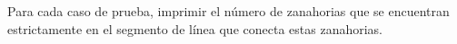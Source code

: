 Para cada caso de prueba, imprimir el número de zanahorias que se encuentran estrictamente en el segmento de línea que conecta estas zanahorias.